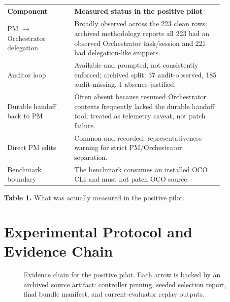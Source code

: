 \documentclass[11pt]{article}
\begin{document}
\begin{center}
\begin{tabular}{p{0.27\linewidth}p{0.60\linewidth}}
\toprule
Component & Measured status in the positive pilot \\
\midrule
PM $\rightarrow$ Orchestrator delegation & Broadly observed across the 223 clean rows; archived methodology reports all 223 had an observed Orchestrator task/session and 221 had delegation-like snippets. \\
Auditor loop & Available and prompted, not consistently enforced; archived split: 37 audit-observed, 185 audit-missing, 1 absence-justified. \\
Durable handoff back to PM & Often absent because resumed Orchestrator contexts frequently lacked the durable handoff tool; treated as telemetry caveat, not patch failure. \\
Direct PM edits & Common and recorded; representativeness warning for strict PM/Orchestrator separation. \\
Benchmark boundary & The benchmark consumes an installed OCO CLI and must not patch OCO source. \\
\bottomrule
\end{tabular}
\par\vspace{0.5em}
\small\textbf{Table 1.} What was actually measured in the positive pilot.
\end{center}

\section{Experimental Protocol and Evidence Chain}

\begin{figure}[H]
\centering
{}
\caption{Evidence chain for the positive pilot. Each arrow is backed by an archived source artifact: controller pinning, seeded selection report, final bundle manifest, and current-evaluator replay outputs.}
\label{fig:chain}
\end{figure}
\end{document}
